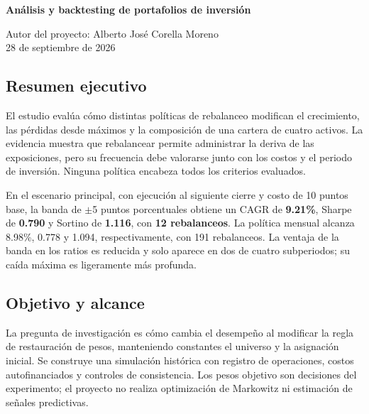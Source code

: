 \documentclass[11pt,letterpaper]{article}
\begin{document}
{\RaggedRight\sffamily\bfseries\fontsize{22.5}{26}\selectfont Análisis y backtesting de portafolios de inversión\par}

\vspace{3pt}{\large\itshape Informe técnico del diseño experimental y los resultados históricos\par}

{\small Autor del proyecto: Alberto José Corella Moreno\\
28 de septiembre de 2026\par}

\vspace{4pt}

\subsection*{Resumen ejecutivo}

El estudio evalúa cómo distintas políticas de rebalanceo modifican el crecimiento, las pérdidas desde máximos y la composición de una cartera de cuatro activos. La evidencia muestra que rebalancear permite administrar la deriva de las exposiciones, pero su frecuencia debe valorarse junto con los costos y el periodo de inversión. Ninguna política encabeza todos los criterios evaluados.

En el escenario principal, con ejecución al siguiente cierre y costo de 10 puntos base, la banda de \ensuremath{\pm}5 puntos porcentuales obtiene un CAGR de \textbf{9.21\%}, Sharpe de \textbf{0.790} y Sortino de \textbf{1.116}, con \textbf{12 rebalanceos}. La política mensual alcanza 8.98\%, 0.778 y 1.094, respectivamente, con 191 rebalanceos. La ventaja de la banda en los ratios es reducida y solo aparece en dos de cuatro subperiodos; su caída máxima es ligeramente más profunda.

\subsection*{Objetivo y alcance}

La pregunta de investigación es cómo cambia el desempeño al modificar la regla de restauración de pesos, manteniendo constantes el universo y la asignación inicial. Se construye una simulación histórica con registro de operaciones, costos autofinanciados y controles de consistencia. Los pesos objetivo son decisiones del experimento; el proyecto no realiza optimización de Markowitz ni estimación de señales predictivas.
\end{document}
